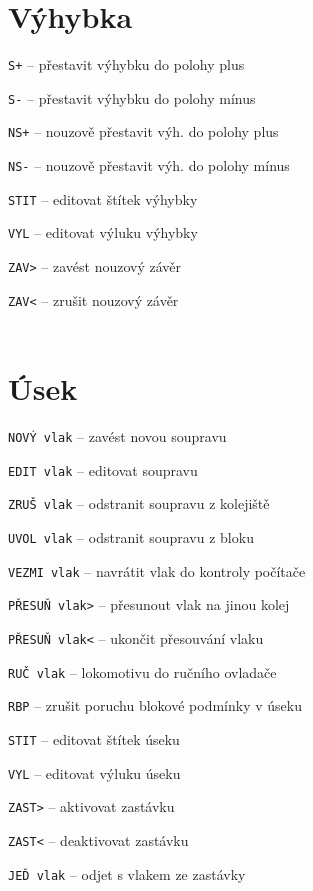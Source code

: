 \documentclass[12pt,a4paper,landscape]{article}
\begin{document}
\begin{multicols}{3}
\section{Výhybka}
\begin{compactitem}
	\item \texttt{S+} -- přestavit výhybku do polohy plus
	\item \texttt{S-} -- přestavit výhybku do polohy mínus
	\item \texttt{NS+} -- nouzově přestavit výh. do polohy plus
	\item \texttt{NS-} -- nouzově přestavit výh. do polohy mínus
	\item \texttt{STIT} -- editovat štítek výhybky
	\item \texttt{VYL} -- editovat výluku výhybky
	\item \texttt{ZAV>} -- zavést nouzový závěr
	\item \texttt{ZAV<} -- zrušit nouzový závěr
	\\
	\\
\end{compactitem}
	
\section{Úsek}
\begin{compactitem}
	\item \texttt{NOVÝ vlak} -- zavést novou soupravu
	\item \texttt{EDIT vlak} -- editovat soupravu
	\item \texttt{ZRUŠ vlak} -- odstranit soupravu z kolejiště
	\item \texttt{UVOL vlak} -- odstranit soupravu z bloku
	\item \texttt{VEZMI vlak} -- navrátit vlak do kontroly počítače
	\item \texttt{PŘESUŇ vlak>} -- přesunout vlak na jinou kolej
	\item \texttt{PŘESUŇ vlak<} -- ukončit přesouvání vlaku
	\item \texttt{RUČ vlak} -- lokomotivu do ručního ovladače
	\item \texttt{RBP} -- zrušit poruchu blokové podmínky v úseku

	\item \texttt{STIT} -- editovat štítek úseku
	\item \texttt{VYL} -- editovat výluku úseku

	\item \texttt{ZAST>} -- aktivovat zastávku
	\item \texttt{ZAST<} -- deaktivovat zastávku
	\item \texttt{JEĎ vlak} -- odjet s vlakem ze zastávky
	

\end{compactitem}
\end{multicols}
\end{document}
